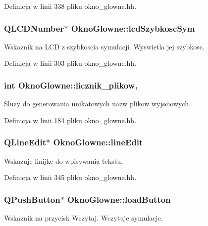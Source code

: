 Definicja w linii 338 pliku okno\-\_\-glowne.\-hh.

\hypertarget{class_okno_glowne_ab100c00d4ba33d896fd0985ac366296a}{
\subsubsection[{lcd\-Szybkosc\-Sym}]{\setlength{\rightskip}{0pt plus 5cm}Q\-L\-C\-D\-Number$\ast$ Okno\-Glowne\-::lcd\-Szybkosc\-Sym\hspace{0.3cm}{\ttfamily [private]}}}\label{class_okno_glowne_ab100c00d4ba33d896fd0985ac366296a}
Wskaznik na L\-C\-D z szybkoscia symulacji. Wyswietla jej szybkosc. 

Definicja w linii 303 pliku okno\-\_\-glowne.\-hh.

\hypertarget{class_okno_glowne_ae615cbd9c9f9ab06b365c4692ff68729}{
\subsubsection[{licznik\-\_\-plikow}]{\setlength{\rightskip}{0pt plus 5cm}int Okno\-Glowne\-::licznik\-\_\-plikow\hspace{0.3cm}{\ttfamily [static]}, {\ttfamily [private]}}}\label{class_okno_glowne_ae615cbd9c9f9ab06b365c4692ff68729}
Sluzy do generowania unikatowych nazw plikow wyjsciowych. 

Definicja w linii 184 pliku okno\-\_\-glowne.\-hh.

\hypertarget{class_okno_glowne_a0112b8be70a26552b03f38fab43a3301}{
\subsubsection[{line\-Edit}]{\setlength{\rightskip}{0pt plus 5cm}Q\-Line\-Edit$\ast$ Okno\-Glowne\-::line\-Edit\hspace{0.3cm}{\ttfamily [private]}}}\label{class_okno_glowne_a0112b8be70a26552b03f38fab43a3301}
Wskazuje linijke do wpisywania tekstu. 

Definicja w linii 345 pliku okno\-\_\-glowne.\-hh.

\hypertarget{class_okno_glowne_accbadc3bc4d418cfe1bce2be61881917}{
\subsubsection[{load\-Button}]{\setlength{\rightskip}{0pt plus 5cm}Q\-Push\-Button$\ast$ Okno\-Glowne\-::load\-Button\hspace{0.3cm}{\ttfamily [private]}}}\label{class_okno_glowne_accbadc3bc4d418cfe1bce2be61881917}
Wskaznik na przycisk Wczytaj. Wczytuje symulacje. 

